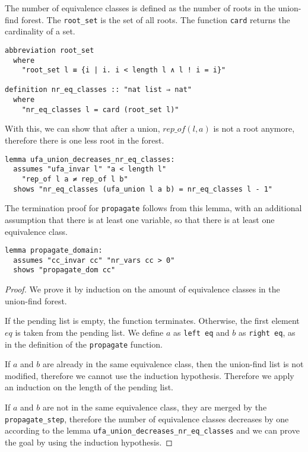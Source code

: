 The number of equivalence classes is defined as the number of roots in the union-find forest. The \lstinline|root_set| is the set of all roots. The function \lstinline|card| returns the cardinality of a set.

\begin{lstlisting}
abbreviation root_set
  where
    "root_set l ≡ {i | i. i < length l ∧ l ! i = i}"

definition nr_eq_classes :: "nat list ⇒ nat"
  where
    "nr_eq_classes l = card (root_set l)"
\end{lstlisting}

With this, we can show that after a union, $rep\_of (l, a)$ is not a root anymore, therefore there is one less root in the forest.

\begin{lstlisting}
lemma ufa_union_decreases_nr_eq_classes:
  assumes "ufa_invar l" "a < length l"
    "rep_of l a ≠ rep_of l b"
  shows "nr_eq_classes (ufa_union l a b) = nr_eq_classes l - 1"
\end{lstlisting}

The termination proof for \lstinline{propagate} follows from this lemma, with an additional assumption that there is at least one variable, so that there is at least one equivalence class.

\begin{lstlisting}
lemma propagate_domain:
  assumes "cc_invar cc" "nr_vars cc > 0"
  shows "propagate_dom cc"
\end{lstlisting}

\begin{proof}
We prove it by induction on the amount of equivalence classes in the union-find forest.

If the pending list is empty, the function terminates. Otherwise, the first element $eq$ is taken from the pending list. We define $a$ as \lstinline{left eq} and $b$ as \lstinline{right eq}, as in the definition of the \lstinline|propagate| function.

If $a$ and $b$ are already in the same equivalence class, then the union-find list is not modified, therefore we cannot use the induction hypothesis. Therefore we apply an induction on the length of the pending list.

If $a$ and $b$ are not in the same equivalence class, they are merged by the \lstinline{propagate_step}, therefore the number of equivalence classes decreases by one according to the lemma \lstinline{ufa_union_decreases_nr_eq_classes} and we can prove the goal by using the induction hypothesis.
\end{proof}

